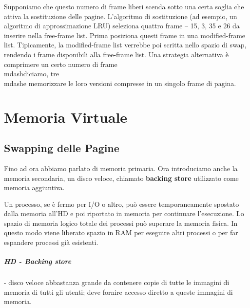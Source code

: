 Supponiamo che questo numero di frame liberi scenda sotto una certa soglia che
attiva la sostituzione delle pagine. L'algoritmo di sostituzione (ad esempio, un algoritmo di approssimazione
LRU) seleziona quattro frame -- 15, 3, 35 e 26 da inserire nella free-frame
list. Prima posiziona questi frame in una modified-frame list. Tipicamente, la
modified-frame list verrebbe poi scritta nello spazio di swap, rendendo i frame
disponibili alla free-frame list. Una strategia alternativa è comprimere un
certo numero di frame{\\mdash}diciamo, tre{\\mdash}e memorizzare le loro versioni compresse in
un singolo frame di pagina.



\chapter{Memoria Virtuale}

\section{Swapping delle Pagine}




Fino ad ora abbiamo parlato di memoria primaria. Ora introduciamo anche la
memoria secondaria, un disco veloce, chiamato \textbf{backing store} utilizzato
come memoria aggiuntiva.


Un processo, se è fermo per I/O o altro, può essere
temporaneamente spostato dalla memoria all'HD e poi riportato in memoria per
continuare l'esecuzione. Lo spazio di memoria logico totale dei processi può
superare la memoria fisica. In questo modo viene liberato spazio in RAM per
eseguire altri processi o per far espandere processi già esistenti.

\paragraph{HD - Backing store} - disco veloce abbastanza grande da contenere copie di tutte
le immagini di memoria di tutti gli utenti; deve fornire accesso diretto a queste
immagini di memoria.


